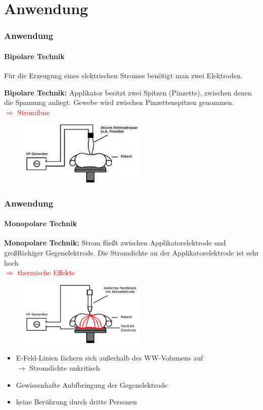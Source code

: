 \documentclass{beamer}
\begin{document}
\section{Anwendung}
\begin{frame}
\frametitle{Anwendung}
\framesubtitle{Bipolare Technik}
	\begin{center}
		Für die Erzeugung eines elektrischen Stromes benötigt man zwei Elektroden.
	\end{center}
	\textbf{Bipolare Technik:}
	Applikator besitzt zwei Spitzen (Pinzette), zwischen denen die Spannung anliegt. Gewebe wird zwischen Pinzettenspitzen genommen. \\\textcolor{red}{$\Rightarrow$ Stromfluss}
	\begin{figure}
		\centering
		\includegraphics[width=6cm]{images/_bipolareTechnik.png}
		\cite{wiki:HF}
	\end{figure}
\end{frame}


\begin{frame}
\frametitle{Anwendung}
\framesubtitle{Monopolare Technik}
	\textbf{Monopolare Technik:}
	Strom fließt zwischen Applikatorelektrode und großflächiger Gegenelektrode. Die Stromdichte an der Applikatorelektrode ist sehr hoch
	\\\textcolor{red}{$\Rightarrow$ thermische Effekte}
	\begin{figure}
		\centering
		\includegraphics[width=6cm]{images/_monopolareTechnik.png}
		\cite{wiki:HF}
	\end{figure}
	\begin{itemize}
		\item E-Feld-Linien fächern sich außerhalb des WW-Volumens auf \\$\rightarrow$ Stromdichte unkritisch
		\item Gewissenhafte Aubfbringung der Gegenelektrode
		\item keine Berührung durch dritte Personen
	\end{itemize}

\end{frame}
\end{document}
